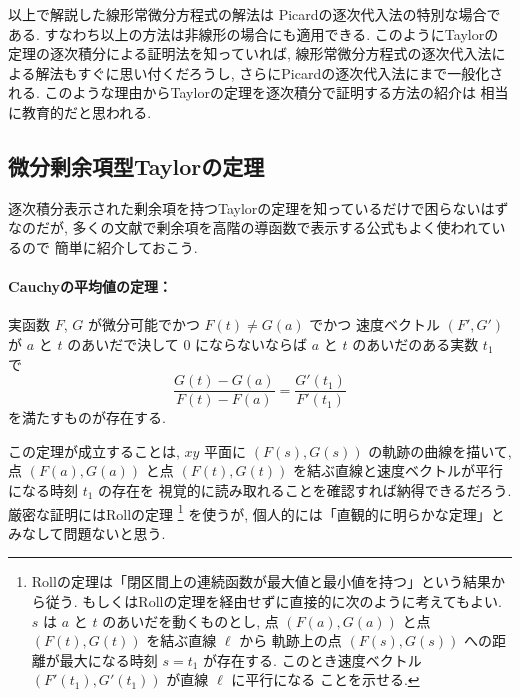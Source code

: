 \documentclass[12pt,twoside]{jarticle}
\theoremstyle{jplain}
\theoremstyle{jplain}
\theoremstyle{jplain}
\numberwithin{theorem}{section}
\numberwithin{equation}{section}
\numberwithin{figure}{section}
\numberwithin{table}{section}
\begin{document}
以上で解説した線形常微分方程式の解法は
Picardの逐次代入法の特別な場合である.
すなわち以上の方法は非線形の場合にも適用できる.
このようにTaylorの定理の逐次積分による証明法を知っていれば,
線形常微分方程式の逐次代入法による解法もすぐに思い付くだろうし,
さらにPicardの逐次代入法にまで一般化される.
このような理由からTaylorの定理を逐次積分で証明する方法の紹介は
相当に教育的だと思われる.


\subsection{微分剰余項型Taylorの定理}

逐次積分表示された剰余項を持つTaylorの定理を知っているだけで困らないはずなのだが,
多くの文献で剰余項を高階の導函数で表示する公式もよく使われているので
簡単に紹介しておこう.

\paragraph{Cauchyの平均値の定理：}
実函数 $F$, $G$ が微分可能でかつ $F(t)\ne G(a)$ でかつ
速度ベクトル $(F',G')$ が $a$ と $t$ のあいだで決して $0$ にならないならば
$a$ と $t$ のあいだのある実数 $t_1$ で
\[
\frac{G(t)-G(a)}{F(t)-F(a)}=\frac{G'(t_1)}{F'(t_1)}
\]
を満たすものが存在する.

この定理が成立することは, $xy$ 平面に $(F(s),G(s))$ の軌跡の曲線を描いて,
点 $(F(a),G(a))$ と点 $(F(t),G(t))$ を結ぶ直線と速度ベクトルが平行になる時刻 $t_1$ の存在を
視覚的に読み取れることを確認すれば納得できるだろう.
厳密な証明にはRollの定理%
\footnote{Rollの定理は「閉区間上の連続函数が最大値と最小値を持つ」という結果から従う.
もしくはRollの定理を経由せずに直接的に次のように考えてもよい.
$s$ は $a$ と $t$ のあいだを動くものとし,
点 $(F(a),G(a))$ と点 $(F(t),G(t))$ を結ぶ直線 $\ell$ から
軌跡上の点 $(F(s),G(s))$ への距離が最大になる時刻 $s=t_1$ が存在する.
このとき速度ベクトル $(F'(t_1),G'(t_1))$ が直線 $\ell$ に平行になる
ことを示せる.
}%
を使うが, 個人的には「直観的に明らかな定理」とみなして問題ないと思う.
\end{document}
